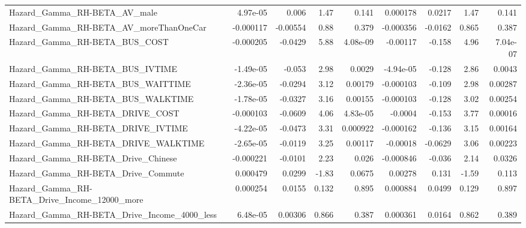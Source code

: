 \begin{tabular}{lrrrrrrrr}
Hazard\_Gamma\_RH-BETA\_AV\_male                       &    4.97e-05 &        0.006 &     1.47 &    0.141 &   0.000178 &      0.0217 &         1.47 &         0.141 \\
Hazard\_Gamma\_RH-BETA\_AV\_moreThanOneCar             &   -0.000117 &     -0.00554 &     0.88 &    0.379 &  -0.000356 &     -0.0162 &        0.865 &         0.387 \\
Hazard\_Gamma\_RH-BETA\_BUS\_COST                      &   -0.000205 &      -0.0429 &     5.88 & 4.08e-09 &   -0.00117 &      -0.158 &         4.96 &      7.04e-07 \\
Hazard\_Gamma\_RH-BETA\_BUS\_IVTIME                    &   -1.49e-05 &       -0.053 &     2.98 &   0.0029 &  -4.94e-05 &      -0.128 &         2.86 &        0.0043 \\
Hazard\_Gamma\_RH-BETA\_BUS\_WAITTIME                  &   -2.36e-05 &      -0.0294 &     3.12 &  0.00179 &  -0.000103 &      -0.109 &         2.98 &       0.00287 \\
Hazard\_Gamma\_RH-BETA\_BUS\_WALKTIME                  &   -1.78e-05 &      -0.0327 &     3.16 &  0.00155 &  -0.000103 &      -0.128 &         3.02 &       0.00254 \\
Hazard\_Gamma\_RH-BETA\_DRIVE\_COST                    &   -0.000103 &      -0.0609 &     4.06 & 4.83e-05 &    -0.0004 &      -0.153 &         3.77 &       0.00016 \\
Hazard\_Gamma\_RH-BETA\_DRIVE\_IVTIME                  &   -4.22e-05 &      -0.0473 &     3.31 & 0.000922 &  -0.000162 &      -0.136 &         3.15 &       0.00164 \\
Hazard\_Gamma\_RH-BETA\_DRIVE\_WALKTIME                &   -2.65e-05 &      -0.0119 &     3.25 &  0.00117 &   -0.00018 &     -0.0629 &         3.06 &       0.00223 \\
Hazard\_Gamma\_RH-BETA\_Drive\_Chinese                 &   -0.000221 &      -0.0101 &     2.23 &    0.026 &  -0.000846 &      -0.036 &         2.14 &        0.0326 \\
Hazard\_Gamma\_RH-BETA\_Drive\_Commute                 &    0.000479 &       0.0299 &    -1.83 &   0.0675 &    0.00278 &       0.131 &        -1.59 &         0.113 \\
Hazard\_Gamma\_RH-BETA\_Drive\_Income\_12000\_more       &    0.000254 &       0.0155 &    0.132 &    0.895 &   0.000884 &      0.0499 &        0.129 &         0.897 \\
Hazard\_Gamma\_RH-BETA\_Drive\_Income\_4000\_less        &    6.48e-05 &      0.00306 &    0.866 &    0.387 &   0.000361 &      0.0164 &        0.862 &         0.389 \\

\end{tabular}
